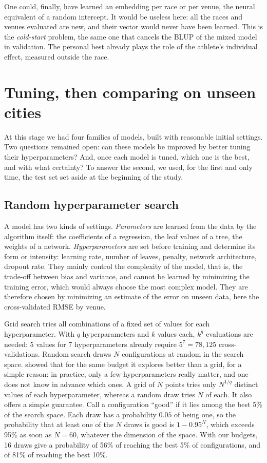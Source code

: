 \documentclass[11pt,a4paper]{article}
\begin{document}
One could, finally, have learned an embedding per race or per venue, the neural equivalent of a random intercept. It
would be useless here: all the races and venues evaluated are new, and their vector would never have been learned.
This is the \emph{cold-start} problem, the same one that cancels the BLUP of the mixed model in validation. The
personal best already plays the role of the athlete's individual effect, measured outside the race.

\section{Tuning, then comparing on unseen cities}\label{sec:comparison}

At this stage we had four families of models, built with reasonable initial settings. Two questions remained open:
can these models be improved by better tuning their hyperparameters? And, once each model is tuned, which one is the
best, and with what certainty? To answer the second, we used, for the first and only time, the test set set aside at
the beginning of the study.

\subsection{Random hyperparameter search}\label{sec:search}

A model has two kinds of settings. \emph{Parameters} are learned from the data by the algorithm itself: the
coefficients of a regression, the leaf values of a tree, the weights of a network. \emph{Hyperparameters} are set
before training and determine its form or intensity: learning rate, number of leaves, penalty, network architecture,
dropout rate. They mainly control the complexity of the model, that is, the trade-off between bias and variance, and
cannot be learned by minimizing the training error, which would always choose the most complex model. They are
therefore chosen by minimizing an estimate of the error on unseen data, here the cross-validated RMSE by venue.

Grid search tries all combinations of a fixed set of values for each hyperparameter. With $q$ hyperparameters and $k$
values each, $k^q$ evaluations are needed: 5 values for 7 hyperparameters already require $5^7 = 78{,}125$
cross-validations. Random search draws $N$ configurations at random in the search space. \citet{bergstra2012} showed
that for the same budget it explores better than a grid, for a simple reason: in practice, only a few hyperparameters
really matter, and one does not know in advance which ones. A grid of $N$ points tries only $N^{1/q}$ distinct values of
each hyperparameter, whereas a random draw tries $N$ of each. It also offers a simple guarantee. Call a configuration
``good'' if it lies among the best 5\% of the search space. Each draw has a probability $0.05$ of being one, so the
probability that at least one of the $N$ draws is good is $1 - 0.95^N$, which exceeds 95\% as soon as $N = 60$,
whatever the dimension of the space. With our budgets, 16 draws give a probability of 56\% of reaching the best 5\% of
configurations, and of 81\% of reaching the best 10\%.
\end{document}
